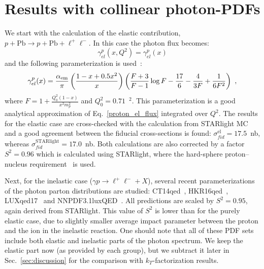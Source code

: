 \section{Results with collinear photon-PDFs}

We start with the calculation of the elastic contribution, $p+\textrm{Pb}\rightarrow p+\textrm{Pb}+ \ell^+\ell^-$.
In this case the photon flux becomes:
\begin{equation}
\gamma^{p}_{el}(x, Q^2) = \gamma^{p}_{el}(x) 
\end{equation}
and the following parameterization is used~\cite{Budnev:1974de}:
\begin{equation}
\gamma^{p}_{el}(x)  = \frac{\alpha_{\rm em}}{\pi}
\left(
\frac{1-x+0.5x^2}{x}
\right)
\left(
\frac{F+3}{F-1}\log{F}-\frac{17}{6}-\frac{4}{3F}+\frac{1}{6F^2}
\right)~,
\end{equation}
where $F = 1+\frac{Q_0^2(1-x)}{x^2 m_p^2}$ and $Q_0^2 = 0.71$~\GeV$^2$. This parameterization is a good analytical approximation of Eq.~\ref{proton_el_flux} integrated over $Q^2$.
The results for the elastic case are cross-checked with the calculation from STARlight MC and a good agreement between the fiducial cross-sections is found:
$\sigma_{fid}^{\textrm{el}} = 17.5$~nb, whereas $\sigma_{fid}^{\textrm{STARlight}} = 17.0$~nb.
Both calculations are also corrected by a factor $S^2=0.96$ which 
is calculated using STARlight, where the hard-sphere proton--nucleus requirement~\cite{Klein:2016yzr} is used.

Next, for the inelastic case ($\gamma p\rightarrow \ell^+\ell^- + X$), several recent parameterizations of the photon parton distributions are studied: CT14qed~\cite{Schmidt:2015zda}, HKR16qed~\cite{Harland-Lang:2016kog}, LUXqed17~\cite{Manohar:2017eqh} and NNPDF3.1luxQED~\cite{Bertone:2017bme}. 
All predictions are scaled by $S^2=0.95$, again derived from STARlight. This value of $S^2$ is lower than for the purely elastic case, due to slightly smaller average impact parameter between the proton and the ion in the inelastic reaction.
One should note that all of these PDF sets include both elastic and inelastic parts of the photon spectrum.
We keep the elastic part now (as provided by each group), but we subtract it later in Sec.~\ref{sec:discussion} for the comparison with $k_T$-factorization results.

